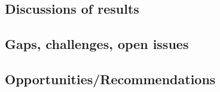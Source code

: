 \documentclass[a4paper,fleqn]{cas-dc}
\begin{document}
\subsection{Discussions of results}
\subsection{Gaps, challenges, open issues}
\subsection{Opportunities/Recommendations}








\end{document}
